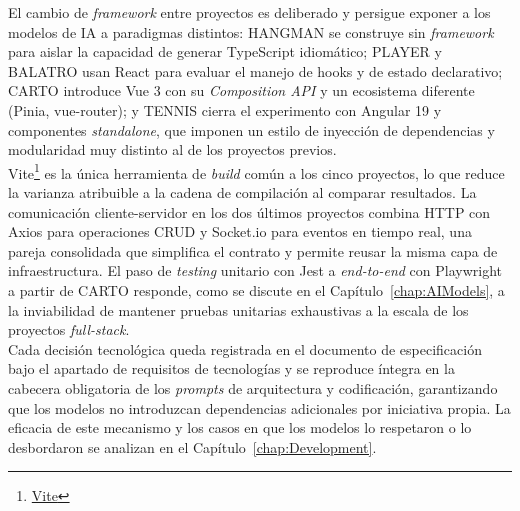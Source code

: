 El cambio de \textit{framework} entre proyectos es deliberado y persigue exponer a los modelos de \ac{IA} a paradigmas distintos: \ac{HANGMAN} se construye sin \textit{framework} para aislar la capacidad de generar TypeScript idiomático; \ac{PLAYER} y \ac{BALATRO} usan React para evaluar el manejo de hooks y de estado declarativo; \ac{CARTO} introduce Vue 3 con su \textit{Composition API} y un ecosistema diferente (Pinia, vue-router); y \ac{TENNIS} cierra el experimento con Angular 19 y componentes \textit{standalone}, que imponen un estilo de inyección de dependencias y modularidad muy distinto al de los proyectos previos.\\

Vite\footnote{\href{https://vitejs.dev}{Vite}} es la única herramienta de \textit{build} común a los cinco proyectos, lo que reduce la varianza atribuible a la cadena de compilación al comparar resultados. La comunicación cliente-servidor en los dos últimos proyectos combina HTTP con Axios para operaciones \ac{CRUD} y Socket.io para eventos en tiempo real, una pareja consolidada que simplifica el contrato y permite reusar la misma capa de infraestructura. El paso de \textit{testing} unitario con Jest a \textit{end-to-end} con Playwright a partir de \ac{CARTO} responde, como se discute en el Capítulo~\ref{chap:AIModels}, a la inviabilidad de mantener pruebas unitarias exhaustivas a la escala de los proyectos \textit{full-stack}.\\

Cada decisión tecnológica queda registrada en el documento de especificación bajo el apartado de requisitos de tecnologías y se reproduce íntegra en la cabecera obligatoria de los \textit{prompts} de arquitectura y codificación, garantizando que los modelos no introduzcan dependencias adicionales por iniciativa propia. La eficacia de este mecanismo y los casos en que los modelos lo respetaron o lo desbordaron se analizan en el Capítulo~\ref{chap:Development}.

